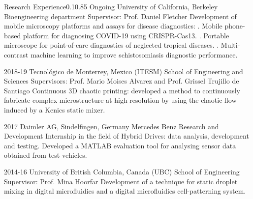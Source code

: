 \documentclass{federico_cv}
\begin{document}
\begin{tblSection}{Research Experience}{0.1}{0.85}
\job
{Ongoing}
{University of California, Berkeley}
{Bioengineering department}
{Supervisor: Prof. Daniel Fletcher}
{Development of mobile microscopy platforms and assays for disease diagnostics:}
{. Mobile phone-based platform for diagnosing COVID-19 using CRISPR-Cas13.}
{. Portable microscope for point-of-care diagnostics of neglected tropical diseases.}
{. Multi-contrast machine learning to improve schistosomiasis diagnostic performance.}

\job
{2018-19}
{Tecnológico de Monterrey, Mexico (ITESM)}
{School of Engineering and Sciences}
{Supervisors: Prof. Mario Moises Alvarez and Prof. Grissel Trujillo de Santiago}
{Continuous 3D chaotic printing: developed a method to continuously fabricate complex microstructure at high resolution by using the chaotic flow induced by a Kenics static mixer.}

\job
{2017}
{Daimler AG, Sindelfingen, Germany}
{Mercedes Benz Research and Development}
{Internship in the field of Hybrid Drives: data analysis, development and testing. Developed a MATLAB evaluation tool for analysing sensor data obtained from test vehicles.}

\job
{2014-16}
{University of British Columbia, Canada (UBC)}
{School of Engineering}
{Supervisor: Prof. Mina Hoorfar}
{Development of a technique for static droplet mixing in digital microfluidics and a digital microfluidics cell-patterning system.}

\end{tblSection}
\let\thefootnote\relax{}\nocite{*}
\printbibliography[keyword={Publications},title={Publications},resetnumbers=true]
\printbibliography[keyword={Patents},title={Patents},resetnumbers=true]
\end{document}
